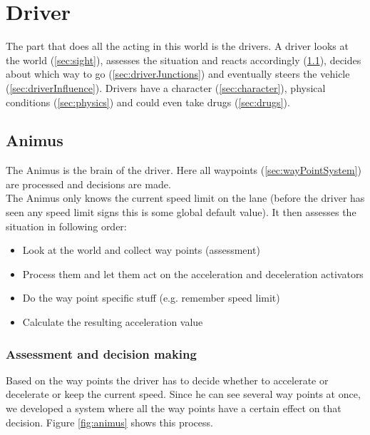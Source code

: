 
\section{Driver}
\label{sec:driver}

The part that does all the acting in this world is the drivers. A
driver looks at the world (\ref{sec:sight}), assesses the situation
and reacts accordingly (\ref{sec:animus}), decides about which
way to go (\ref{sec:driverJunctions}) and eventually steers the
vehicle (\ref{sec:driverInfluence}). Drivers have a character
(\ref{sec:character}), physical conditions (\ref{sec:physics}) and could
even take drugs (\ref{sec:drugs}). \\

\subsection{Animus}
\label{sec:animus}

The Animus is the brain of the driver. Here all waypoints 
(\ref{sec:wayPointSystem}) are processed and decisions are made. \\

\noindent The Animus only knows the current speed limit on the lane 
(before the driver has seen any speed limit signs this is some global
default value). It then assesses the situation in following order:

\begin{itemize}
\item Look at the world and collect way points (assessment)
\item Process them and let them act on the acceleration and deceleration activators
\item Do the way point specific stuff (e.g. remember speed limit)
\item Calculate the resulting acceleration value
\end{itemize}

\subsubsection{Assessment and decision making}
\label{sec:assessment}

Based on the way points the driver has to decide whether to accelerate or
decelerate or keep the current speed. Since he can see several way points
at once, we developed a system where all the way points have a certain effect 
on that decision. Figure \ref{fig:animus} shows this process.

